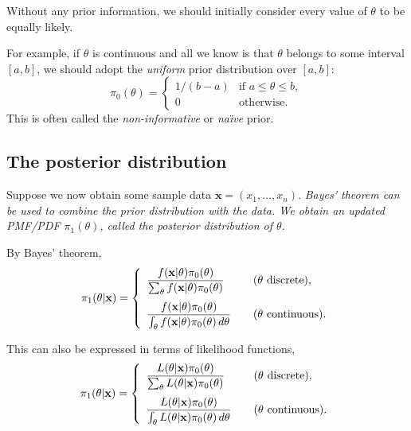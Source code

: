 \begin{remark}
Without any prior information, we should initially consider every value of $\theta$ to be equally likely. 

\vspace*{2ex}
For example, if $\theta$ is continuous and all we know is that $\theta$ belongs to some interval $[a,b]$, we should adopt the \emph{uniform} prior distribution over $[a,b]$:
\[
\pi_0(\theta) = \left\{\begin{array}{ll}
	1/(b-a)	& \text{if } a\leq\theta\leq b, \\
	0	& \text{otherwise.}
\end{array}\right.
\]
This is often called the \emph{non-informative} or \emph{na\"{\i}ve} prior.
\end{remark}


\subsection{The posterior distribution}
Suppose we now obtain some sample data $\mathbf{x}=(x_1,\ldots,x_n)$. 
\bit
\it Bayes' theorem can  be used to combine the prior distribution with the data.
\it We obtain an updated PMF/PDF $\pi_1(\theta)$, called the \emph{posterior distribution} of $\theta$.
\eit

By Bayes' theorem, 
\[
\pi_1(\theta|\mathbf{x}) = \left\{\begin{array}{ll}
	\displaystyle\frac{f(\mathbf{x}|\theta)\pi_0(\theta)}{\sum_{\theta}f(\mathbf{x}|\theta)\pi_0(\theta)} 			& \text{\quad ($\theta$ discrete)}, \\[3ex]
	\displaystyle\frac{f(\mathbf{x}|\theta)\pi_0(\theta)}{\int_{\theta}f(\mathbf{x}|\theta)\pi_0(\theta)\,d\theta} 	& \text{\quad ($\theta$ continuous)}.
\end{array}\right.
\]

\vspace*{2ex}
This can also be expressed in terms of likelihood functions,
\[
\pi_1(\theta|\mathbf{x}) = \left\{\begin{array}{ll}
	\displaystyle\frac{L(\theta|\mathbf{x})\pi_0(\theta)}{\sum_{\theta}L(\theta|\mathbf{x})\pi_0(\theta)} 			& \text{\quad ($\theta$ discrete)}, \\[3ex]
	\displaystyle\frac{L(\theta|\mathbf{x})\pi_0(\theta)}{\int_{\theta}L(\theta|\mathbf{x})\pi_0(\theta)\,d\theta} 	& \text{\quad ($\theta$ continuous)}.
\end{array}\right.
\]

